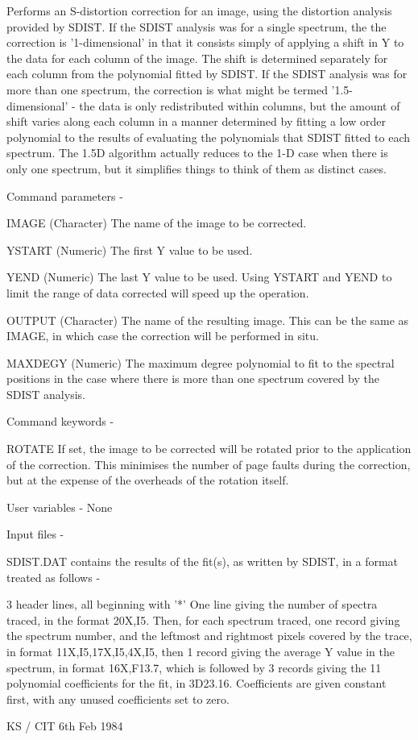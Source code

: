 \begin{description}
\begin{terminalv}
 Performs an S-distortion correction for an image, using the
 distortion analysis provided by SDIST.  If the SDIST analysis
 was for a single spectrum, the the correction is '1-dimensional'
 in that it consists simply of applying a shift in Y to the
 data for each column of the image.  The shift is determined
 separately for each column from the polynomial fitted by SDIST.
 If the SDIST analysis was for more than one spectrum, the
 correction is what might be termed '1.5-dimensional' - the
 data is only redistributed within columns, but the amount of
 shift varies along each column in a manner determined by fitting
 a low order polynomial to the results of evaluating the polynomials
 that SDIST fitted to each spectrum.  The 1.5D algorithm actually
 reduces to the 1-D case when there is only one spectrum, but it
 simplifies things to think of them as distinct cases.

 Command parameters -

 IMAGE    (Character) The name of the image to be corrected.

 YSTART   (Numeric) The first Y value to be used.

 YEND     (Numeric) The last Y value to be used.  Using YSTART
          and YEND to limit the range of data corrected will
          speed up the operation.

 OUTPUT   (Character) The name of the resulting image.  This
          can be the same as IMAGE, in which case the correction
          will be performed in situ.

 MAXDEGY  (Numeric) The maximum degree polynomial to fit to the
          spectral positions in the case where there is more
          than one spectrum covered by the SDIST analysis.

 Command keywords -

 ROTATE   If set, the image to be corrected will be rotated
          prior to the application of the correction.  This
          minimises the number of page faults during the correction,
          but at the expense of the overheads of the rotation itself.

 User variables - None

 Input files -

 SDIST.DAT contains the results of the fit(s), as written by
           SDIST, in a format treated as follows -

           3 header lines, all beginning with '*'
           One line giving the number of spectra traced, in the
           format 20X,I5.
           Then, for each spectrum traced, one record giving
           the spectrum number, and the leftmost and rightmost
           pixels covered by the trace, in format
           11X,I5,17X,I5,4X,I5, then 1 record giving the average
           Y value in the spectrum, in format 16X,F13.7,
           which is followed by 3 records giving the 11
           polynomial coefficients for the fit, in 3D23.16.
           Coefficients are given constant first, with any unused
           coefficients set to zero.

                                          KS / CIT 6th Feb 1984
\end{terminalv}
\end{description}
